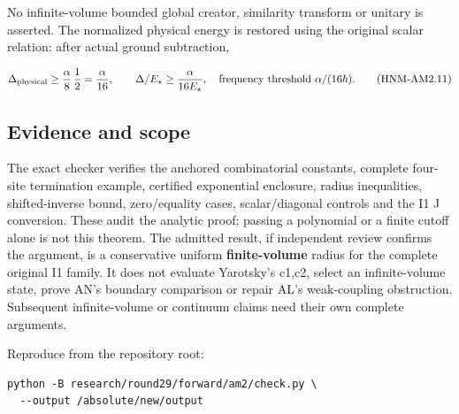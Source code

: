 No infinite-volume bounded global creator, similarity transform or unitary is asserted. The normalized physical energy is restored using the original scalar relation: after actual ground subtraction,

\begin{equation}
\Delta_{\rm physical}\ge{\alpha\over8}\,{1\over2}={\alpha\over16},
\qquad\Delta/E_\star\ge{\alpha\over16E_\star},
\quad\hbox{frequency threshold }\alpha/(16\hbar).
\tag{HNM-AM2.11}
\label{r29:am2:eq11}
\end{equation}

\hypertarget{r29-am2-evidence-and-scope}{%
\subsection{Evidence and scope}\label{r29:am2:r29-am2-evidence-and-scope}}

The exact checker verifies the anchored combinatorial constants, complete four-site termination example, certified exponential enclosure, radius inequalities, shifted-inverse bound, zero/equality cases, scalar/diagonal controls and the I1 J conversion. These audit the analytic proof; passing a polynomial or a finite cutoff alone is not this theorem. The admitted result, if independent review confirms the argument, is a conservative uniform \textbf{finite-volume} radius for the complete original I1 family. It does not evaluate Yarotsky's c1,c2, select an infinite-volume state, prove AN's boundary comparison or repair AL's weak-coupling obstruction. Subsequent infinite-volume or continuum claims need their own complete arguments.

Reproduce from the repository root:
\begin{verbatim}
python -B research/round29/forward/am2/check.py \
  --output /absolute/new/output
\end{verbatim}

